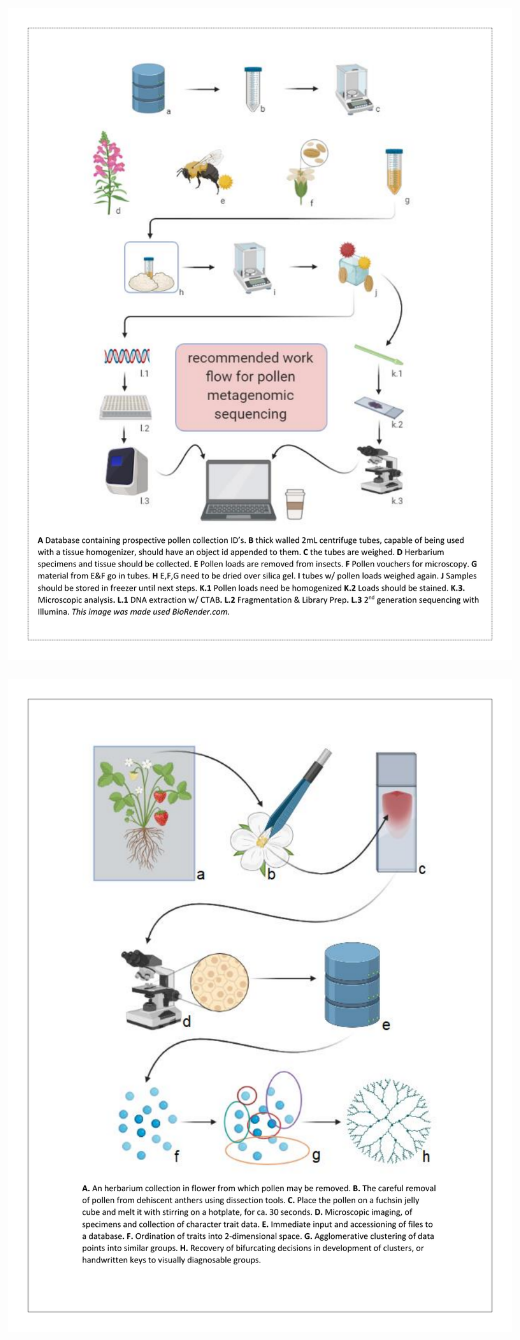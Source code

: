 \documentclass[
]{article}
\begin{document}
\includegraphics{../graphics/assorted/overall_metagenomic_workflow.pdf}

\newpage

\includegraphics{../graphics/assorted/microscopy_workflow.pdf}
\end{document}
